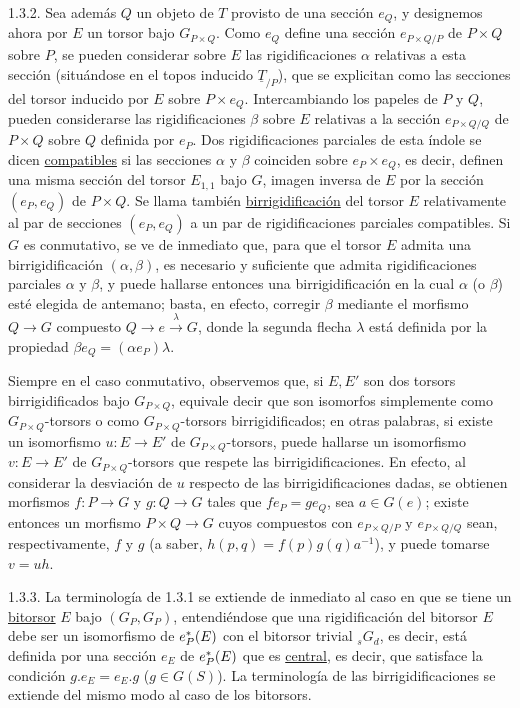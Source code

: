 1.3.2.  Sea además $Q$ un objeto de \underline{$T$} provisto de una
sección $e_Q$, y designemos ahora por $E$ un torsor bajo
$G_{P\times Q}$. Como $e_Q$ define una sección $e_{P\times Q/P}$ de
$P\times Q$ sobre $P$, se pueden considerar sobre $E$ las
rigidificaciones $\alpha$ relativas a esta sección (situándose en el
topos inducido $\underline{T}_{/P}$), que se explicitan como las
secciones del torsor inducido por $E$ sobre $P\times e_Q$.
Intercambiando los papeles de $P$ y $Q$, pueden considerarse las
rigidificaciones $\beta$ sobre $E$ relativas a la sección
$e_{P\times Q/Q}$ de $P\times Q$ sobre $Q$ definida por $e_P$. Dos
rigidificaciones parciales de esta índole se dicen \underline{compatibles}
si las secciones $\alpha$ y $\beta$ coinciden sobre
$e_P\times e_Q$, es decir, definen una misma sección del torsor
$E_{1,1}$ bajo $G$, imagen
inversa de $E$ por la sección $(e_P,e_Q)$ de $P\times Q$. Se llama
también \underline{birrigidificación} del torsor $E$ relativamente al
par de secciones $(e_P,e_Q)$ a un par de rigidificaciones parciales
compatibles. Si $G$ es conmutativo, se ve de inmediato que, para que el
torsor $E$ admita una birrigidificación $(\alpha,\beta)$, es necesario
y suficiente que admita rigidificaciones parciales $\alpha$ y $\beta$,
y puede hallarse entonces una birrigidificación en la cual $\alpha$ (o
$\beta$) esté elegida de antemano; basta, en efecto, corregir $\beta$
mediante el morfismo $Q \longrightarrow G$ compuesto
$Q \longrightarrow e \xrightarrow{\lambda} G$, donde la segunda
flecha $\lambda$ está definida por la propiedad
$\beta e_Q = (\alpha e_P)\lambda$.

Siempre en el caso conmutativo, observemos que, si $E,E'$ son dos
torsors birrigidificados bajo $G_{P\times Q}$, equivale decir que son
isomorfos simplemente como $G_{P\times Q}$-torsors o como
$G_{P\times Q}$-torsors birrigidificados; en otras palabras, si existe
un isomorfismo $u : E \longrightarrow E'$ de $G_{P\times Q}$-torsors,
puede hallarse un isomorfismo $v : E \longrightarrow E'$ de
$G_{P\times Q}$-torsors que respete las birrigidificaciones. En efecto,
al considerar la desviación de $u$ respecto de las birrigidificaciones
dadas, se obtienen morfismos $f:P \longrightarrow G$ y
$g : Q \longrightarrow G$ tales que $fe_P=ge_Q$, sea
$a \in G(e)$; existe entonces un morfismo
$P\times Q \longrightarrow G$ cuyos compuestos con
$e_{P\times Q/P}$ y $e_{P\times Q/Q}$ sean, respectivamente, $f$ y
$g$ (a saber, $h(p,q) = f(p)g(q)a^{-1}$), y puede tomarse $v = uh$.

1.3.3.  La terminología de 1.3.1 se extiende de inmediato al caso en
que se tiene un \underline{bitorsor} $E$ bajo $(G_P,G_P)$,
entendiéndose que una rigidificación del bitorsor $E$ debe ser un
isomorfismo de $\sisi{e_P(E)}{e_P^*(E)}$ con el bitorsor trivial
$_sG_d$, es decir, está definida por una sección $e_E$ de
$\sisi{e_P(E)}{e_P^*(E)}$ que es \underline{central},
es decir, que satisface la condición $g.e_E = e_E.g$ ($g \in G(S)$).
La terminología de las
birrigidificaciones se extiende del mismo modo al caso de los bitorsors.
